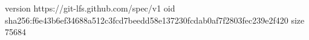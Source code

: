 version https://git-lfs.github.com/spec/v1
oid sha256:f6e43b6ef34688a512c3fcd7beedd58e137230fcdab0af7f2803fec239e2f420
size 75684

